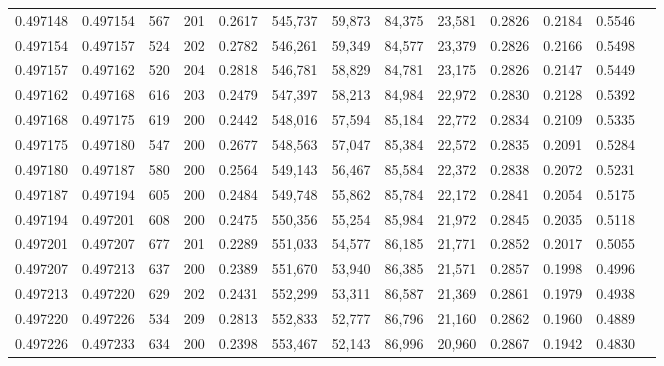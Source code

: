 \begin{tabular}{rrrrrrrrrrrrr}
0.497148 & 0.497154 &   567 & 201 &                                     0.2617 & 545,737 &  59,873 &  84,375 &  23,581 & 0.2826 & 0.2184 & 0.5546 \\
0.497154 & 0.497157 &   524 & 202 &                                     0.2782 & 546,261 &  59,349 &  84,577 &  23,379 & 0.2826 & 0.2166 & 0.5498 \\
0.497157 & 0.497162 &   520 & 204 &                                     0.2818 & 546,781 &  58,829 &  84,781 &  23,175 & 0.2826 & 0.2147 & 0.5449 \\
0.497162 & 0.497168 &   616 & 203 &                                     0.2479 & 547,397 &  58,213 &  84,984 &  22,972 & 0.2830 & 0.2128 & 0.5392 \\
0.497168 & 0.497175 &   619 & 200 &                                     0.2442 & 548,016 &  57,594 &  85,184 &  22,772 & 0.2834 & 0.2109 & 0.5335 \\
0.497175 & 0.497180 &   547 & 200 &                                     0.2677 & 548,563 &  57,047 &  85,384 &  22,572 & 0.2835 & 0.2091 & 0.5284 \\
0.497180 & 0.497187 &   580 & 200 &                                     0.2564 & 549,143 &  56,467 &  85,584 &  22,372 & 0.2838 & 0.2072 & 0.5231 \\
0.497187 & 0.497194 &   605 & 200 &                                     0.2484 & 549,748 &  55,862 &  85,784 &  22,172 & 0.2841 & 0.2054 & 0.5175 \\
0.497194 & 0.497201 &   608 & 200 &                                     0.2475 & 550,356 &  55,254 &  85,984 &  21,972 & 0.2845 & 0.2035 & 0.5118 \\
0.497201 & 0.497207 &   677 & 201 &                                     0.2289 & 551,033 &  54,577 &  86,185 &  21,771 & 0.2852 & 0.2017 & 0.5055 \\
0.497207 & 0.497213 &   637 & 200 &                                     0.2389 & 551,670 &  53,940 &  86,385 &  21,571 & 0.2857 & 0.1998 & 0.4996 \\
0.497213 & 0.497220 &   629 & 202 &                                     0.2431 & 552,299 &  53,311 &  86,587 &  21,369 & 0.2861 & 0.1979 & 0.4938 \\
0.497220 & 0.497226 &   534 & 209 &                                     0.2813 & 552,833 &  52,777 &  86,796 &  21,160 & 0.2862 & 0.1960 & 0.4889 \\
0.497226 & 0.497233 &   634 & 200 &                                     0.2398 & 553,467 &  52,143 &  86,996 &  20,960 & 0.2867 & 0.1942 & 0.4830 \\

\end{tabular}
